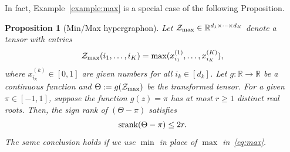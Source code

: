 \documentclass[11pt]{article}
\theoremstyle{plain}
\newtheorem{prop}{Proposition}[section]
\theoremstyle{definition}
\def\srank{\textup{srank}}
\begin{document}
In fact, Example~\ref{example:max} is a special case of the following Proposition. 

\begin{prop}[Min/Max hypergraphon] Let $\mathcal{Z}_{\max}\in\mathbb{R}^{d_1\times \cdots \times d_K}$ denote a tensor with entries 
\begin{equation}\label{eq:max}
\mathcal{Z}_{\max}(i_1,\ldots,i_K)=\max(x^{(1)}_{i_1},\ldots,x^{(K)}_{i_K}),
\end{equation}
where $x^{(k)}_{i_k}\in[0,1]$ are given numbers for all $i_k\in[d_k]$. Let $g\colon \mathbb{R}\to \mathbb{R}$ be a continuous function and $\Theta:=g(\mathcal{Z}_{\max})$ be the transformed tensor. For a given $\pi\in[-1,1]$, suppose the function $g(z)=\pi$ has at most $r\geq 1$ distinct real roots. Then, the sign rank of $(\Theta-\pi)$ satisfies
\[
\srank(\Theta-\pi)\leq 2r.
\]
The same conclusion holds if we use $\min$ in place of $\max$ in~\eqref{eq:max}. 
\end{prop}
\end{document}
